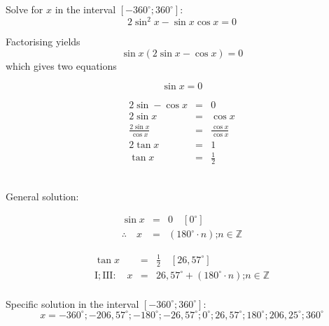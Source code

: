 \begin{wex}{}
{
Solve for $x$ in the interval $[-360^\circ;360^\circ]$:
\[2\sin^2x-\sin x \cos x = 0 \]
}%
{
Factorising yields
\[\sin x(2\sin x - \cos x) = 0\]
which gives two equations\\
\begin{minipage}{0.5\textwidth}
\[ \sin x = 0 \]
\[ \]
\[ \]
\[ \]
\end{minipage}
\begin{minipage}{0.5\textwidth}
\begin{eqnarray*}
2\sin - \cos x &=& 0\\
2\sin x &=& \cos x \\
\frac{2\sin x}{\cos x} &=& \frac{\cos x}{\cos x} \\
2\tan x &=& 1 \\
\tan x &=& \tfrac{1}{2}
\end{eqnarray*}
\end{minipage}\\
General solution:\\
\begin{minipage}{0.5\textwidth}
\begin{eqnarray*}
 \sin x & = & 0 \quad [0^\circ]\\
\therefore \quad x &=& (180^\circ\cdot n)\mbox{;} n\in\mathbb{Z}
\end{eqnarray*}
\end{minipage}
\begin{minipage}{0.5\textwidth}
\begin{eqnarray*}
\tan x &=& \tfrac{1}{2} \quad [26,57^\circ]\\
\mathrm{I;III:} \quad x &=& 26,57^\circ +  (180^\circ\cdot n)\mbox{;} n\in\mathbb{Z}\\
\end{eqnarray*}
\end{minipage}

Specific solution in the interval  $[-360^\circ;360^\circ]$:
\[ x = -360^\circ; -206,57^\circ; -180^\circ; -26,57^\circ; 0^\circ; 26,57^\circ; 180^\circ; 206,25^\circ; 360^\circ \]
}%
\end{wex}


